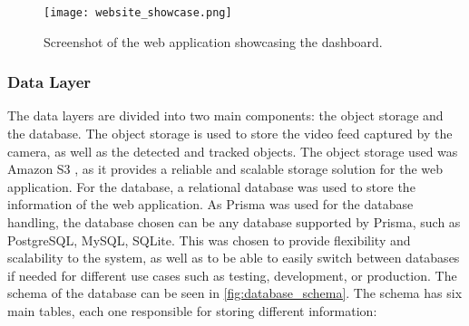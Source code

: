 \begin{figure}
	\texttt{[image: website\_showcase.png]}
	\caption{Screenshot of the web application showcasing the dashboard.}\label{fig:web_application}
\end{figure}

\subsubsection{Data Layer}\label{subsubsec:implementation_data_layer}

The data layers are divided into two main components: the object storage and the database. The object storage is used to store the video feed captured by the camera, as well as the detected and tracked objects. The object storage used was Amazon S3 \autocite{amazonCloudComputing}, as it provides a reliable and scalable storage solution for the web application.  For the database, a relational database was used to store the information of the web application. As Prisma \autocite{prismaPrismaSimplify} was used for the database handling, the database chosen can be any database supported by Prisma, such as PostgreSQL, MySQL, SQLite. This was chosen to provide flexibility and scalability to the system, as well as to be able to easily switch between databases if needed for different use cases such as testing, development, or production. The schema of the database can be seen in \cref{fig:database_schema}. The schema has six main tables, each one responsible for storing different information:

